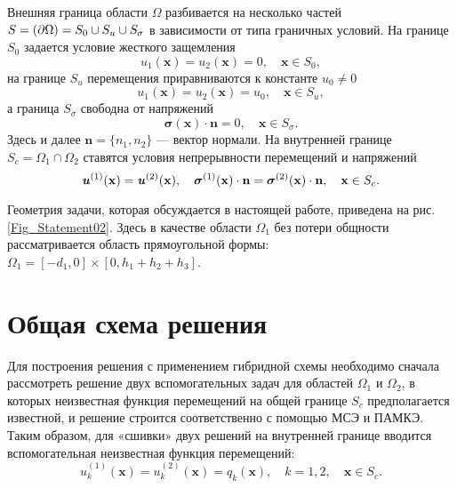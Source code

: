 \documentclass[press]{vestnik}
\begin{document}
Внешняя граница области $\Omega$ разбивается на несколько частей $S \dm =  (\partial \Omega) = S_{0} \cup S_{u} \cup S_{\sigma}$ в зависимости от типа граничных условий. На границе $S_{0}$ задается условие жесткого защемления
\begin{equation} \label{S_0}
	u_{1}({\bm{x}})=u_{2}({\bm{x}})=0, \quad {\bm{x}} \in S_{0},
\end{equation}
на границе $S_{u}$ перемещения приравниваются к константе $u_0 \neq 0$
\begin{equation} \label{S_u}
	u_{1}({\bm{x}})=u_{2}({\bm{x}}) = u_0, \quad {\bm{x}} \in S_{u},
\end{equation}
а граница $S_{\sigma}$ свободна от напряжений
\begin{equation} \label{S_sigm}
	\bm{\sigma}(\bm{x}) \cdot \bm{n} = 0, \quad {\bm{x}} \in S_{\sigma}.
\end{equation}
Здесь и далее $\bm{n}=\{n_{1}^{},n_{2}^{}\}$ --- вектор нормали. На внутренней границе $S_{c} = \Omega_1 \cap \Omega_2$ ставятся условия непрерывности перемещений и напряжений
\begin{equation} \label{Sc}
	\textbf{\textit{u}}^{(1)}(\bm{x}) = \textbf{\textit{u}}^{(2)}(\bm{x}), \quad  \bm{\sigma}^{(1)}(\bm{x}) \cdot \bm{n} = \bm{\sigma}^{(2)}(\bm{x}) \cdot \bm{n}, \quad {\bm{x}} \in S_{c}.
\end{equation}



Геометрия задачи, которая обсуждается в настоящей работе, приведена на рис. \ref{Fig_Statement02}. Здесь в качестве области $\Omega_{1}$ без потери общности рассматривается область прямоугольной формы: $\Omega_{1} = [-d_{1},0] \times [0,h_{1}+h_{2}+h_{3}]$.



\section{Общая схема решения}
Для построения решения с применением гибридной схемы необходимо сначала рассмотреть решение двух вспомогательных задач для областей $\Omega_{1}$ и $\Omega_{2}$, в которых неизвестная функция перемещений на общей границе $S_{c}$ предполагается известной, и решение строится соответственно с помощью МСЭ и ПАМКЭ. Таким образом, для «сшивки» двух решений на внутренней границе вводится вспомогательная неизвестная функция перемещений:
\begin{equation} \label{Sq}
	u_{k}^{(1)}({\bm{x}}) = u_{k}^{(2)}({\bm{x}}) = q_{k}({\bm{x}}), \quad k=1,2, \quad {\bm{x}} \in S_{c}.
\end{equation}
\end{document}
